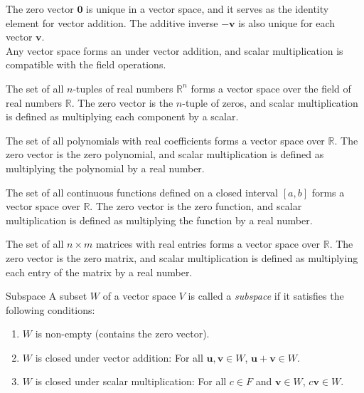 \documentclass[openany]{book}
\begin{document}
\begin{mynote}
The zero vector $\mathbf{0}$ is unique in a vector space, and it serves as the identity element for vector addition. The additive inverse $-\mathbf{v}$ is also unique for each vector $\mathbf{v}$. \\
Any vector space forms an  under vector addition, and scalar multiplication is compatible with the field operations.
\end{mynote}
\begin{example}
    The set of all $n$-tuples of real numbers $\mathbb{R}^n$ forms a vector space over the field of real numbers $\mathbb{R}$. The zero vector is the $n$-tuple of zeros, and scalar multiplication is defined as multiplying each component by a scalar.
\end{example}
\begin{example}
    The set of all polynomials with real coefficients forms a vector space over $\mathbb{R}$. The zero vector is the zero polynomial, and scalar multiplication is defined as multiplying the polynomial by a real number.
\end{example}
\begin{example}
    The set of all continuous functions defined on a closed interval $[a, b]$ forms a vector space over $\mathbb{R}$. The zero vector is the zero function, and scalar multiplication is defined as multiplying the function by a real number.
\end{example}
\begin{example}
    The set of all $n \times m$ matrices with real entries forms a vector space over $\mathbb{R}$. The zero vector is the zero matrix, and scalar multiplication is defined as multiplying each entry of the matrix by a real number.
\end{example}
\begin{mydefinition}{Subspace}
A subset $W$ of a vector space $V$ is called a \emph{subspace} if it satisfies the following conditions:
\begin{enumerate}
    \item $W$ is non-empty (contains the zero vector).
    \item $W$ is closed under vector addition: For all $\mathbf{u}, \mathbf{v} \in W$, $\mathbf{u} + \mathbf{v} \in W$.
    \item $W$ is closed under scalar multiplication: For all $c \in F$ and $\mathbf{v} \in W$, $c\mathbf{v} \in W$.
\end{enumerate}
\end{mydefinition}
\end{document}

